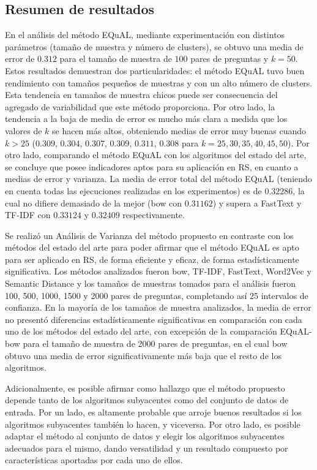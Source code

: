 \subsection{Resumen de resultados}
En el análisis del método EQuAL, mediante experimentación con distintos parámetros (tamaño de muestra y número de clusters), se obtuvo una media de error de \(0.312\) para el tamaño de muestra de \(100\) pares de preguntas y \(k = 50\). Estos resultados demuestran dos particularidades: el método EQuAL tuvo buen rendimiento con tamaños pequeños de muestras y con un alto número de clusters. Esta tendencia en tamaños de muestra chicos puede ser consecuencia del agregado de variabilidad que este método proporciona. Por otro lado, la tendencia a la baja de media de error es mucho más clara a medida que los valores de \(k\) se hacen más altos, obteniendo medias de error muy buenas cuando \(k > 25\) (\(0.309\), \(0.304\), \(0.307\), \(0.309\), \(0.311\), \(0.308\) para \(k = 25, 30, 35, 40, 45, 50\)). Por otro lado, comparando el método EQuAL con los algoritmos del estado del arte, se concluye que posee indicadores aptos para su aplicación en RS, en cuanto a medias de error y varianza. La media de error total del método EQuAL (teniendo en cuenta todas las ejecuciones realizadas en los experimentos) es de \(0.32286\), la cual no difiere demasiado de la mejor (bow con \(0.31162\)) y supera a FastText y TF-IDF con \(0.33124\) y \(0.32409\) respectivamente.

\bigskip Se realizó un Análisis de Varianza del método propuesto en contraste con los métodos del estado del arte para poder afirmar que el método EQuAL es apto para ser aplicado en RS, de forma eficiente y eficaz, de forma estadísticamente significativa. Los métodos analizados fueron bow, TF-IDF, FastText, Word2Vec y Semantic Distance y los tamaños de muestras tomados para el análisis fueron 100, 500, 1000, 1500 y 2000 pares de preguntas, completando así 25 intervalos de confianza. En la mayoría de los tamaños de muestra analizados, la media de error no presentó diferencias estadísticamente significativas en comparación con cada uno de los métodos del estado del arte, con excepción de la comparación EQuAL-bow para el tamaño de muestra de 2000 pares de preguntas, en el cual bow obtuvo una media de error significativamente más baja que el resto de los algoritmos.

\bigskip Adicionalmente, es posible afirmar como hallazgo que el método propuesto depende tanto de los algoritmos subyacentes como del conjunto de datos de entrada. Por un lado, es altamente probable que arroje buenos resultados si los algoritmos subyacentes también lo hacen, y viceversa. Por otro lado, es posible adaptar el método al conjunto de datos y elegir los algoritmos subyacentes adecuados para el mismo, dando versatilidad y un resultado compuesto por características aportadas por cada uno de ellos.

